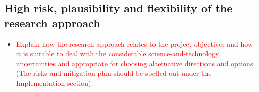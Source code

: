 \documentclass[11pt, a4paper]{article} %
\begin{document}

\subsection{High risk, plausibility and flexibility of the research approach}


\begin{itemize}
\item \textcolor{red}{Explain how the research approach relates to the
    project objectives and how it is suitable to deal with the
    considerable science-and-technology uncertainties and appropriate
    for choosing alternative directions and options. (The risks and
    mitigation plan should be spelled out under the Implementation
    section).}
\end{itemize}

\end{document}

